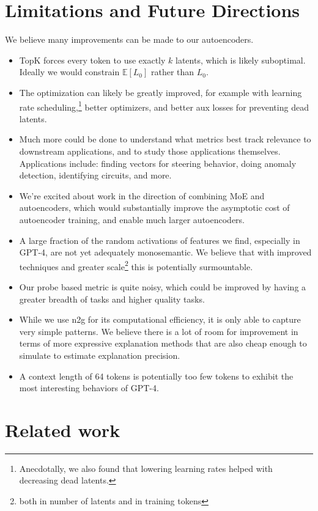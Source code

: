 \section{Limitations and Future Directions}
We believe many improvements can be made to our autoencoders.

\begin{itemize}
    \item TopK forces every token to use exactly $k$ latents, which is likely suboptimal. Ideally we would constrain $\mathbb E[L_0]$ rather than $L_0$.
    \item The optimization can likely be greatly improved, for example with  learning rate scheduling,\footnote{Anecdotally, we also found that lowering learning rates helped with decreasing dead latents.} better optimizers, and better aux losses for preventing dead latents.
    \item Much more could be done to understand what metrics best track relevance to downstream applications, and to study those applications themselves.  Applications include:  finding vectors for steering behavior, doing anomaly detection, identifying circuits, and more.
    \item We're excited about work in the direction of combining MoE \citep{shazeer2017outrageously} and autoencoders, which would substantially improve the asymptotic cost of autoencoder training, and enable much larger autoencoders.
    \item A large fraction of the random activations of features we find, especially in GPT-4, are not yet adequately monosemantic. We believe that with improved techniques and greater scale\footnote{both in number of latents and in training tokens} this is potentially surmountable.
    \item Our probe based metric is quite noisy, which could be improved by having a greater breadth of tasks and higher quality tasks.
    \item While we use n2g for its computational efficiency, it is only able to capture very simple patterns. We believe there is a lot of room for improvement in terms of more expressive explanation methods that are also cheap enough to simulate to estimate explanation precision.
    \item A context length of 64 tokens is potentially too few tokens to exhibit the most interesting behaviors of GPT-4.

\end{itemize}


\section{Related work}

